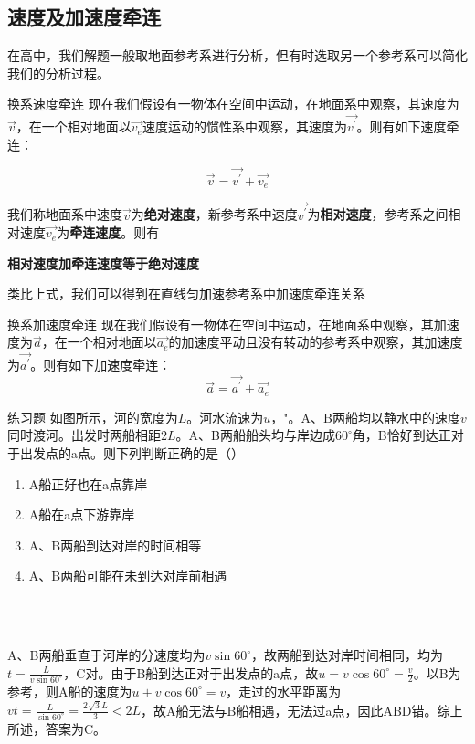 \subsection{速度及加速度牵连}
\label{s_sdql}

在高中，我们解题一般取地面参考系进行分析，但有时选取另一个参考系可以简化我们的分析过程。



\begin{theo}{换系速度牵连}{}
现在我们假设有一物体在空间中运动，在地面系中观察，其速度为$\vec{v}$，在一个相对地面以$\vec{v_e}$速度运动的惯性系中观察，其速度为$\vec{v^{\prime}}$。则有如下速度牵连：

$$\vec{v} = \vec{v^{\prime}} + \vec{v_e}$$

我们称地面系中速度$\vec{v}$为\textbf{绝对速度}，新参考系中速度$\vec{v^{\prime}}$为\textbf{相对速度}，参考系之间相对速度$\vec{v_e}$为\textbf{牵连速度}。则有
\begin{center}
\textbf{相对速度加牵连速度等于绝对速度}
\end{center}

\end{theo}

类比上式，我们可以得到在直线匀加速参考系中加速度牵连关系

\begin{theo}{换系加速度牵连}{}
现在我们假设有一物体在空间中运动，在地面系中观察，其加速度为$\vec{a}$，在一个相对地面以$\vec{a_e}$的加速度平动且没有转动的参考系中观察，其加速度为$\vec{a^{\prime}}$。则有如下加速度牵连：
$$\vec{a} = \vec{a^{\prime}} + \vec{a_e}$$
\end{theo}

\begin{ep}{练习题}{}
如图所示，河的宽度为$L$。河水流速为$u$，"。A、B两船均以静水中的速度$v$同时渡河。出发时两船相距$2L$。A、B两船船头均与岸边成$60^{\circ}$角，B恰好到达正对于出发点的a点。则下列判断正确的是（）

\begin{minipage}[b]{0.65\linewidth}
\begin{enumerate}[label=(\Alph*)]
  \item A船正好也在a点靠岸
  \item A船在a点下游靠岸
  \item A、B两船到达对岸的时间相等
  \item A、B两船可能在未到达对岸前相遇
\end{enumerate}
\end{minipage}
\hfill
\begin{minipage}[b]{0.3\linewidth}

~\\
\end{minipage}
~\\

A、B两船垂直于河岸的分速度均为$v \sin 60^{\circ}$，故两船到达对岸时间相同，均为$t=\frac{L}{v \sin 60^{\circ}}$，C对。由于B船到达正对于出发点的a点，故$u = v \cos 60^{\circ} = \frac{v}{2}$。以B为参考，则A船的速度为$u + v \cos 60^{\circ} = v$，走过的水平距离为$v t = \frac{L}{\sin 60^{\circ}} = \frac{2 \sqrt{3} L}{3} < 2L$，故A船无法与B船相遇，无法过a点，因此ABD错。综上所述，答案为C。
\end{ep}

